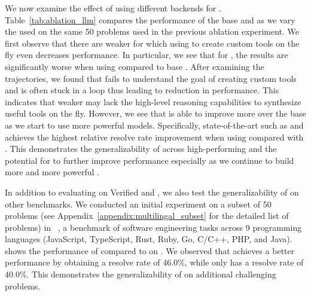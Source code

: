 We now examine the effect of using different \llm backends for \tech.
Table~\ref{tab:ablation_llm} compares the performance of the base \minisweagent and \tech as we vary the \llm used on the same 50 problems used in the previous ablation experiment.
We first observe that there are weaker  for which using \tech to create custom tools on the fly even decreases performance.
In particular, we see that for \gptfivenano{}, the results are significantly worse when using \tech compared to base \minisweagent.
After examining the trajectories, we found that \gptfivenano{} fails to understand the goal of creating custom tools and is often stuck in a loop thus leading to reduction in performance.
This indicates that weaker  may lack the high-level reasoning capabilities to synthesize useful tools on the fly.
However, we see that \tech is able to improve more over the base \minisweagent as we start to use more powerful models.
Specifically, state-of-the-art  such as \claudesonnetfour{} and \gptfive{} achieves the highest relative resolve rate improvement when using \tech compared with \minisweagent.
This demonstrates the generalizability of \tech across high-performing  and the potential for \tech to further improve performance especially as we continue to build more and more powerful .

\begin{table}[t!]
\centering
\caption{Result on a subset of \swebenchmultilingual{} problems}
\label{tab:multilingual}
\end{table}


In addition to evaluating on \swebench Verified and \swebenchpro, we also test the generalizability of \tech on other benchmarks. 
We conducted an initial experiment on a subset of 50 problems (see Appendix~\ref{appendix:multilingal_subset} for the detailed list of problems) in \swebenchmultilingual~\citep{sbm}, a benchmark of software engineering tasks across 9 programming languages (JavaScript, TypeScript, Rust, Ruby, Go, C/C++, PHP, and Java).
 shows the performance of \tech compared to \minisweagent on \swebenchmultilingual. 
We observed that \tech achieves a better performance by obtaining a resolve rate of 46.0\%, while \minisweagent only has a resolve rate of 40.0\%.
This demonstrates the generalizability of \tech on additional challenging problems.

